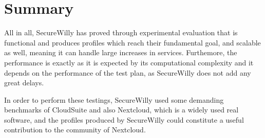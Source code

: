 \section{Summary}
All in all, SecureWilly has proved through experimental evaluation that is functional and produces profiles which reach their fundamental goal, and scalable as well, meaning it can handle large increases in services. Furthemore, the performance is exactly as it is expected by its computational complexity and it depends on the performance of the test plan, as SecureWilly does not add any great delays.

In order to perform these testings, SecureWilly used some demanding benchmarks of CloudSuite and also Nextcloud, which is a widely used real software, and the profiles produced by SecureWilly could constitute a useful contribution to the community of Nextcloud.
